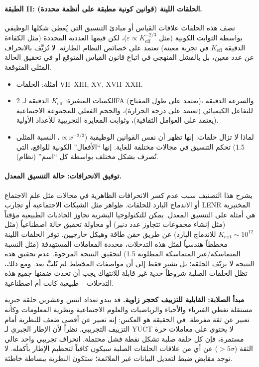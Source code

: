 \documentclass[12pt,a4paper]{article}
\begin{document}
	\paragraph{الطبقة II: الحلقات اللينة (قوانين كونية مطبقة على أنظمة محددة).}
	تصف هذه الحلقات علاقات القياس أو مبادئ التنسيق التي يُعطى شكلها الوظيفي بواسطة الثوابت الكونية (مثل \(\varepsilon \propto K_{\mathrm{eff}}^{-2/3}\))، لكن قيمها العددية المحددة (مثل الكفاءة الدقيقة \(K_{\mathrm{eff}}\) في تجربة معينة) تعتمد على خصائص النظام الطارئة. لا تُزيَّف بالانحراف عن عدد معين، بل بالفشل المنهجي في اتباع قانون القياس المتوقع أو في تحقيق الحالة المثلى المتوقعة.
	\begin{itemize}
		\item أمثلة: الحلقات VII--XIII, XV, XVII--XXII.
		\item الكميات المتغيرة: \(K_{\mathrm{eff}}\) الدقيقة لـ 2FA (تعتمد على طول المفتاح)، والسرعة الدقيقة للتفاعل الكيميائي (تعتمد على درجة الحرارة)، والحجم الفعلي للمجموعة الاجتماعية (يعتمد على العوامل الثقافية)، وثوابت المعايرة التجريبية للأعداد الأولية.
		\item لماذا لا تزال حلقات: إنها تظهر أن نفس القوانين الوظيفية (\(\propto x^{-2/3}\)، النسبة المثلى 1.5) تحكم التنسيق في مجالات مختلفة للغاية. إنها ``الأفعال'' الكونية للواقع، التي تُصرف بشكل مختلف بواسطة كل ``اسم'' (نظام).
	\end{itemize}
	
	\paragraph{توفيق الانحرافات: حالة التنسيق المعدل.}
	يشرح هذا التصنيف سبب عدم كسر الانحرافات الظاهرية في مجالات مثل علم الاجتماع أو الاندماج البارد للحلقات. ظواهر مثل الشبكات الاجتماعية أو تجارب LENR المختبرية هي أمثلة على التنسيق المعدل. يمكن للتكنولوجيا البشرية تجاوز الجاذبات الطبيعية مؤقتاً (مثل إنشاء مجموعات تتجاوز عدد دنبر) أو محاولة تحقيق حالة اصطناعياً (مثل \(K_{\mathrm{crit}} \sim 10^{12}\) للاندماج البارد) عن طريق حقن طاقة وهيكل خارجيين. توفر الحلقات اللينة مخططاً هندسياً لمثل هذه التدخلات، محددة المعاملات المستهدفة (مثل النسبة المتماسكة/غير المتماسكة المطلوبة 1.5) لتحقيق النتيجة المرجوة. عدم تحقيق هذه النتيجة لا يزيّف الحلقة؛ بل يشير فقط إلى أن مواصفات المخطط لم تُلبَّ بعد. ومع ذلك، تظل الحلقات الصلبة شروطاً حدية غير قابلة للانتهاك يجب أن تحدث ضمنها جميع هذه التدخلات – طبيعية كانت أم اصطناعية.
	
	\vspace{0.5cm}
	\noindent
	\textbf{مبدأ الصلابة: القابلية للتزييف كحجر زاوية.}
	قد يبدو تعداد اثنتين وعشرين حلقة جبرية مستقلة تغطي الفيزياء والأحياء والرياضيات والعلوم الاجتماعية ونظرية المعلومات وكأنه تعبير عن ثقة مفرطة. في الحقيقة هو العكس: إنه تعبير عن أقصى ضعف للنظرية أمام التزييف التجريبي. نظراً لأن الإطار الجبري لـ YUCT لا يحتوي على معاملات حرة مستمرة، فإن كل حلقة صلبة تشكل نقطة فشل محتملة. انحراف تجريبي واحد عالي الثقة (\(>5\sigma\)) عن أي من علاقات الحلقات الصلبة سيكون كافياً لتحطيم الإطار بأكمله. لا توجد مقابض ضبط لتعديل البيانات غير الملائمة؛ ستكون النظرية ببساطة خاطئة.
	
\end{document}
